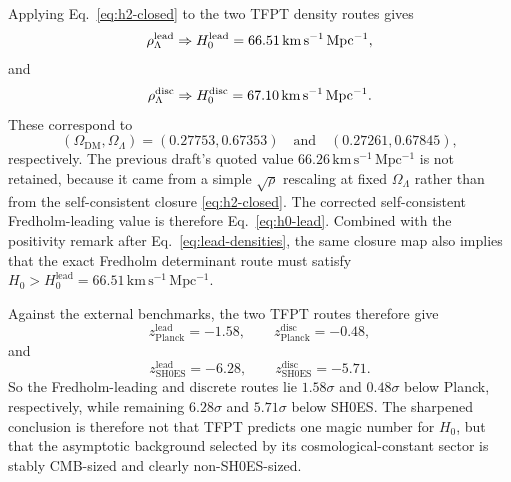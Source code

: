 Applying Eq.~\eqref{eq:h2-closed} to the two TFPT density routes gives
\begin{equation}
\rho_{\Lambda}^{\mathrm{lead}}
\Rightarrow
H_0^{\mathrm{lead}}
=
66.51\,\mathrm{km\,s^{-1}\,Mpc^{-1}},
\label{eq:h0-lead}
\end{equation}
and
\begin{equation}
\rho_{\Lambda}^{\mathrm{disc}}
\Rightarrow
H_0^{\mathrm{disc}}
=
67.10\,\mathrm{km\,s^{-1}\,Mpc^{-1}}.
\label{eq:h0-disc}
\end{equation}
These correspond to
\[
(\Omega_{\mathrm{DM}},\Omega_{\Lambda})
=(0.27753,0.67353)
\quad\text{and}\quad
(0.27261,0.67845),
\]
respectively. The previous draft's quoted value $66.26\,\mathrm{km\,s^{-1}\,Mpc^{-1}}$ is not retained, because it came from a simple $\sqrt{\rho}$ rescaling at fixed $\Omega_{\Lambda}$ rather than from the self-consistent closure \eqref{eq:h2-closed}. The corrected self-consistent Fredholm-leading value is therefore Eq.~\eqref{eq:h0-lead}.
Combined with the positivity remark after Eq.~\eqref{eq:lead-densities}, the same closure map also implies that the exact Fredholm determinant route must satisfy $H_0>H_0^{\mathrm{lead}}=66.51\,\mathrm{km\,s^{-1}\,Mpc^{-1}}$.

Against the external benchmarks, the two TFPT routes therefore give
\[
z_{\mathrm{Planck}}^{\mathrm{lead}}=-1.58,
\qquad
z_{\mathrm{Planck}}^{\mathrm{disc}}=-0.48,
\]
and
\[
z_{\mathrm{SH0ES}}^{\mathrm{lead}}=-6.28,
\qquad
z_{\mathrm{SH0ES}}^{\mathrm{disc}}=-5.71.
\]
So the Fredholm-leading and discrete routes lie $1.58\sigma$ and $0.48\sigma$ below Planck, respectively, while remaining $6.28\sigma$ and $5.71\sigma$ below SH0ES. The sharpened conclusion is therefore not that TFPT predicts one magic number for $H_0$, but that the asymptotic background selected by its cosmological-constant sector is stably CMB-sized and clearly non-SH0ES-sized.

